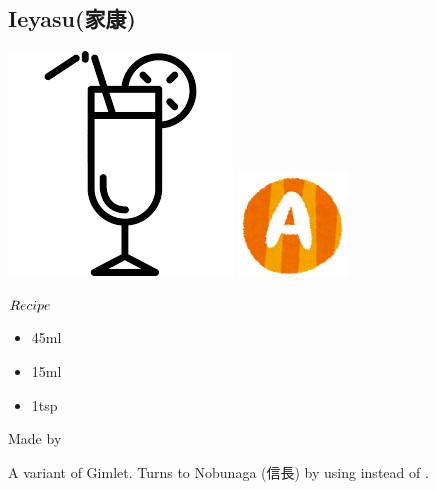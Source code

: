 \subsection{Ieyasu(家康)}
\vspace{-7.4mm}
\hspace{38mm}
\includegraphics[scale=.07]{cocktail_glass_tall.png}
\includegraphics[scale=.12]{capital_a.png}
\vspace{2.5mm}
\begin{itembox}[l]{\boldmath $Recipe$}
\begin{itemize}
\setlength{\parskip}{0cm}
\setlength{\itemsep}{0cm}
\item \gin 45ml
\item \limj 15ml
\item \cc 1tsp
\end{itemize}
\vspace{-4mm}
Made by \shake
\end{itembox}
A variant of Gimlet.  Turns to Nobunaga (信長) by using \gs instead of \cc
\hspace{-1mm}.
